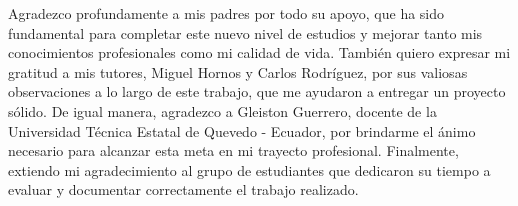 
Agradezco profundamente a mis padres por todo su apoyo, que ha sido fundamental para completar este nuevo nivel de estudios y mejorar tanto mis conocimientos profesionales como mi calidad de vida. También quiero expresar mi gratitud a mis tutores, Miguel Hornos y Carlos Rodríguez, por sus valiosas observaciones a lo largo de este trabajo, que me ayudaron a entregar un proyecto sólido. De igual manera, agradezco a Gleiston Guerrero, docente de la Universidad Técnica Estatal de Quevedo - Ecuador, por brindarme el ánimo necesario para alcanzar esta meta en mi trayecto profesional. Finalmente, extiendo mi agradecimiento al grupo de estudiantes que dedicaron su tiempo a evaluar y documentar correctamente el trabajo realizado.
